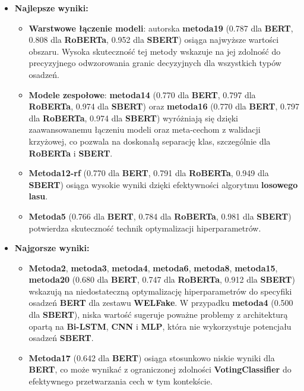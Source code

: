 \begin{itemize}
	\item \textbf{Najlepsze wyniki:}
	      \begin{itemize}
		      \item \textbf{Warstwowe łączenie modeli}: autorska \textbf{metoda19} (0.787 dla \textbf{BERT}, 0.808 dla \textbf{RoBERTa}, 0.952 dla \textbf{SBERT}) osiąga najwyższe wartości obszaru. Wysoka skuteczność tej metody wskazuje na jej zdolność do precyzyjnego odwzorowania granic decyzyjnych dla wszystkich typów osadzeń.
		      \item \textbf{Modele zespołowe}: \textbf{metoda14} (0.770 dla \textbf{BERT}, 0.797 dla \textbf{RoBERTa}, 0.974 dla \textbf{SBERT}) oraz \textbf{metoda16} (0.770 dla \textbf{BERT}, 0.797 dla \textbf{RoBERTa}, 0.974 dla \textbf{SBERT}) wyróżniają się dzięki zaawansowanemu łączeniu modeli oraz meta-cechom z walidacji krzyżowej, co pozwala na doskonałą separację klas, szczególnie dla \textbf{RoBERTa} i \textbf{SBERT}.
		      \item \textbf{Metoda12-rf} (0.770 dla \textbf{BERT}, 0.791 dla \textbf{RoBERTa}, 0.949 dla \textbf{SBERT}) osiąga wysokie wyniki dzięki efektywności algorytmu \textbf{losowego lasu}.
		      \item \textbf{Metoda5} (0.766 dla \textbf{BERT}, 0.784 dla \textbf{RoBERTa}, 0.981 dla \textbf{SBERT}) potwierdza skuteczność technik optymalizacji hiperparametrów.
	      \end{itemize}
	\item \textbf{Najgorsze wyniki:}
	      \begin{itemize}
		      \item \textbf{Metoda2}, \textbf{metoda3}, \textbf{metoda4}, \textbf{metoda6}, \textbf{metoda8}, \textbf{metoda15}, \textbf{metoda20} (0.680 dla \textbf{BERT}, 0.747 dla \textbf{RoBERTa}, 0.912 dla \textbf{SBERT}) wskazują na niedostateczną optymalizację hiperparametrów do specyfiki osadzeń \textbf{BERT} dla zestawu \textbf{WELFake}. W przypadku \textbf{metoda4} (0.500 dla \textbf{SBERT}), niska wartość sugeruje poważne problemy z architekturą opartą na \textbf{Bi-LSTM}, \textbf{CNN} i \textbf{MLP}, która nie wykorzystuje potencjału osadzeń \textbf{SBERT}.
		      \item \textbf{Metoda17} (0.642 dla \textbf{BERT}) osiąga stosunkowo niskie wyniki dla \textbf{BERT}, co może wynikać z ograniczonej zdolności \textbf{VotingClassifier} do efektywnego przetwarzania cech w tym kontekście.
	      \end{itemize}
\end{itemize}

